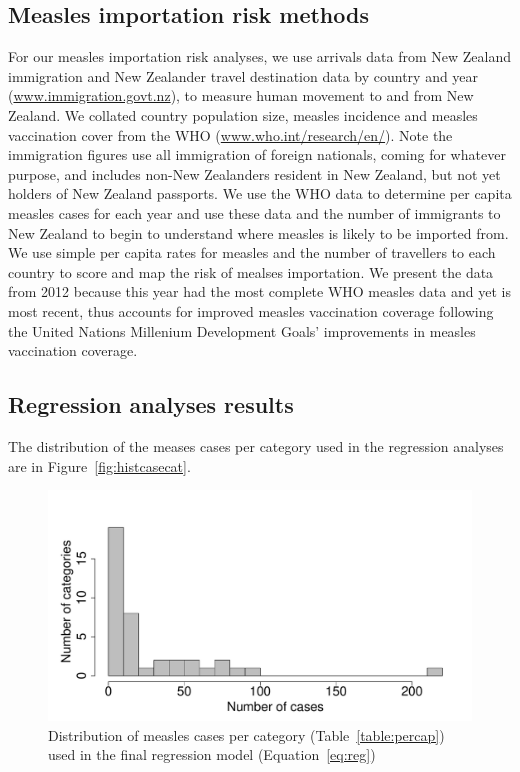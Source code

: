 \documentclass{article}
\begin{document}
\subsection{Measles importation risk methods}
\label{sub:imp_risk}
For our measles importation risk analyses, we use arrivals data from New Zealand immigration and New Zealander travel destination data by country and year (\href{http://www.immigration.govt.nz/}{www.immigration.govt.nz}), to measure human movement to and from New Zealand. We collated country population size, measles incidence and measles vaccination cover from the WHO (\href{http://www.who.int/research/en/}{www.who.int/research/en/}). Note the immigration figures use all immigration of foreign nationals, coming for whatever purpose, and includes non-New Zealanders resident in New Zealand, but not yet holders of New Zealand passports. We use the WHO data to determine per capita measles cases for each year and use these data and the number of immigrants to New Zealand to begin to understand where measles is likely to be imported from. We use simple per capita rates for measles and the number of travellers to each country to score and map the risk of mealses importation. We present the data from 2012 because this year had the most complete WHO measles data and yet is most recent, thus accounts for improved measles vaccination coverage following the United Nations Millenium Development Goals' improvements in measles vaccination coverage. 


\subsection{Regression analyses results}
\label{sub:regression_results}

The distribution of the meases cases per category used in the regression analyses are in Figure~\autoref{fig:histcasecat}.
\begin{figure}
\begin{center}
\includegraphics{draftfinalreport-014}
\end{center}
\caption{Distribution of measles cases per category (Table~\autoref{table:percap}) used in the final regression model (Equation~\autoref{eq:reg})}
\label{fig:histcasecat}
\end{figure}
\end{document}
